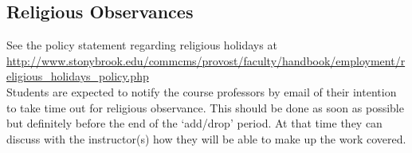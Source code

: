 \documentclass[10pt]{article}
\begin{document}
\subsection*{Religious Observances}

See the policy statement regarding religious holidays at\hfill\\
{\footnotesize \url{http://www.stonybrook.edu/commcms/provost/faculty/handbook/employment/religious_holidays_policy.php}} \\
%
Students are expected to notify the course professors by email of
their intention to take time out for religious observance.  This
should be done as soon as possible but definitely before the end of
the `add/drop' period.  At that time they can discuss with the
instructor(s) how they will be able to make up the work covered.
\end{document}
